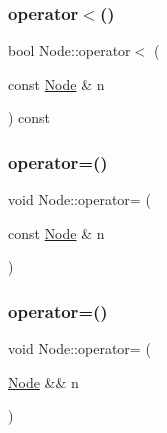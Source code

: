 \mbox{\label{class_node_a8b05feb361beb04d465619751a2297b1}} 
\subsubsection{\texorpdfstring{operator$<$()}{operator<()}}
{\footnotesize\ttfamily bool Node\+::operator$<$ (\begin{DoxyParamCaption}\item[{const \hyperlink{class_node}{Node} \&}]{n }\end{DoxyParamCaption}) const\hspace{0.3cm}{\ttfamily [inline]}}

\mbox{\label{class_node_addbfe90949f473c91203389f48095cf0}} 
\subsubsection{\texorpdfstring{operator=()}{operator=()}\hspace{0.1cm}{\footnotesize\ttfamily [1/2]}}
{\footnotesize\ttfamily void Node\+::operator= (\begin{DoxyParamCaption}\item[{const \hyperlink{class_node}{Node} \&}]{n }\end{DoxyParamCaption})\hspace{0.3cm}{\ttfamily [inline]}}

\mbox{\label{class_node_abcd5c8ca2ea54716a72f7e27f9a9c937}} 
\subsubsection{\texorpdfstring{operator=()}{operator=()}\hspace{0.1cm}{\footnotesize\ttfamily [2/2]}}
{\footnotesize\ttfamily void Node\+::operator= (\begin{DoxyParamCaption}\item[{\hyperlink{class_node}{Node} \&\&}]{n }\end{DoxyParamCaption})\hspace{0.3cm}{\ttfamily [inline]}}

\mbox{\label{class_node_a90aeee00ccda27f36bea9cdd774eae8d}} 
